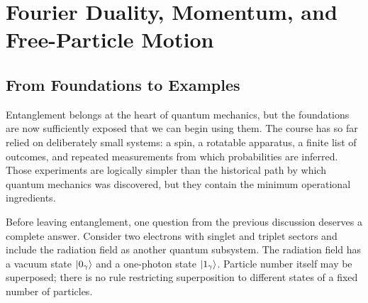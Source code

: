 \chapter{Fourier Duality, Momentum, and Free-Particle Motion}

\section{From Foundations to Examples}

Entanglement belongs at the heart of quantum mechanics, but the foundations are now sufficiently exposed that we can begin using them. The course has so far relied on deliberately small systems: a spin, a rotatable apparatus, a finite list of outcomes, and repeated measurements from which probabilities are inferred. Those experiments are logically simpler than the historical path by which quantum mechanics was discovered, but they contain the minimum operational ingredients.

\begin{classroomqa}
\end{classroomqa}

\begin{classroomqa}
\end{classroomqa}

Before leaving entanglement, one question from the previous discussion deserves a complete answer. Consider two electrons with singlet and triplet sectors and include the radiation field as another quantum subsystem. The radiation field has a vacuum state \(\left\lvert0_\gamma\right\rangle\) and a one-photon state \(\left\lvert1_\gamma\right\rangle\). Particle number itself may be superposed; there is no rule restricting superposition to different states of a fixed number of particles.

